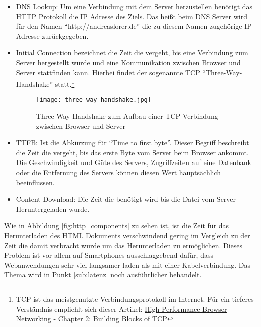 			\begin{itemize}
				\item DNS Lookup: Um eine Verbindung mit dem Server herzustellen benötigt das HTTP Protokoll die IP Adresse des Ziels. Das heißt beim DNS Server wird für den Namen "`http://andreaslorer.de"' die zu diesem Namen zugehörige IP Adresse zurückgegeben.

				\item Initial Connection bezeichnet die Zeit die vergeht, bis eine Verbindung zum Server hergestellt wurde und eine Kommunikation zwischen Browser und Server stattfinden kann. Hierbei findet der sogenannte TCP "`Three-Way-Handshake"' statt.\footnote{TCP ist das meistgenutzte Verbindungsprotokoll im Internet. Für ein tieferes Verständnis empfiehlt sich dieser Artikel: \href{http://chimera.labs.oreilly.com/books/1230000000545/ch02.html}{High Performance Browser Networking - Chapter 2: Building Blocks of TCP}}

				\begin{figure}[htbp]
					\begin{center}
						\texttt{[image: three\_way\_handshake.jpg]}
						\caption{Three-Way-Handshake zum Aufbau einer TCP Verbindung zwischen Browser und Server}
						\label{fig:three_way_handshake}
					\end{center}
				\end{figure}

				\item TTFB: Ist die Abkürzung für "`Time to first byte"'. Dieser Begriff beschreibt die Zeit die vergeht, bis das erste Byte vom Server beim Browser ankommt. Die Geschwindigkeit und Güte des Servers, Zugriffzeiten auf eine Datenbank oder die Entfernung des Servers können diesen Wert hauptsächlich beeinflussen.

				\item Content Download: Die Zeit die benötigt wird bis die Datei vom Server Heruntergeladen wurde.
			\end{itemize}

			Wie in Abbildung \ref{fig:http_components} zu sehen ist, ist die Zeit für das Herunterladen des HTML Dokuments verschwindend gering im Vergleich zu der Zeit die damit verbracht wurde um das Herunterladen zu ermöglichen. Dieses Problem ist vor allem auf Smartphones ausschlaggebend dafür, dass Webanwendungen sehr viel langsamer laden als mit einer Kabelverbindung. Das Thema wird in Punkt \ref{sub:latenz} noch ausführlicher behandelt.
			
			

